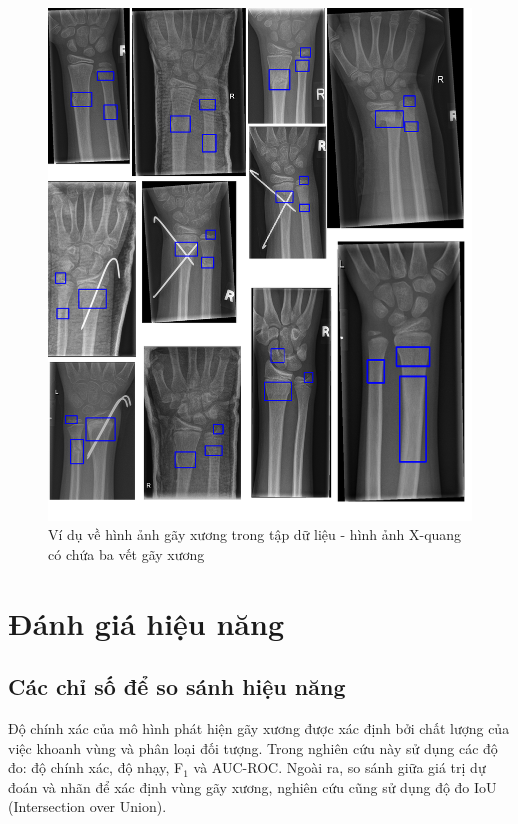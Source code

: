 \documentclass[../the.tex]{subfiles}
\begin{document}
\begin{figure}[H]
\centering
	\includegraphics[width=1\textwidth]{images/dataset_3.png}
	\caption{Ví dụ về hình ảnh gãy xương trong tập dữ liệu - hình ảnh X-quang có chứa ba vết gãy xương}
	\label{fig:dataset_3}
\end{figure}

\section{Đánh giá hiệu năng}
\label{sec:eval}

\subsection{Các chỉ số để so sánh hiệu năng}

{\fontsize{13}{12} \selectfont
Độ chính xác của mô hình phát hiện gãy xương được xác định bởi chất lượng của việc khoanh vùng và phân loại đối tượng. Trong nghiên cứu này sử dụng các độ đo: độ chính xác, độ nhạy, F$_1$ và AUC-ROC. Ngoài ra, so sánh giữa giá trị dự đoán và nhãn để xác định vùng gãy xương, nghiên cứu cũng sử dụng độ đo IoU (Intersection over Union). 
}
\end{document}
